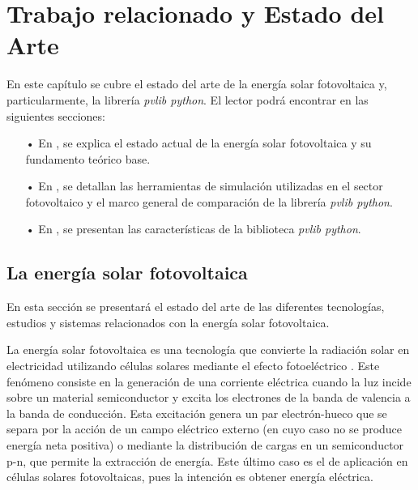 \chapter{Trabajo relacionado y Estado del Arte} \label{chp:state-of-the-art}

En este capítulo se cubre el estado del arte de la energía solar fotovoltaica y, particularmente, la librería \textit{pvlib python}. El lector podrá encontrar en las siguientes secciones:

\begin{itemize}

    \item[•] En , se explica el estado actual de la energía solar fotovoltaica y su fundamento teórico base.

    \item[•] En , se detallan las herramientas de simulación utilizadas en el sector fotovoltaico y el marco general de comparación de la librería \textit{pvlib python}.

    \item[•] En , se presentan las características de la biblioteca \textit{pvlib python}.

\end{itemize}


\section{La energía solar fotovoltaica} \label{sct:energia-solar}

En esta sección se presentará el estado del arte de las diferentes tecnologías, estudios y sistemas relacionados con la energía solar fotovoltaica.

La energía solar fotovoltaica es una tecnología que convierte la radiación solar en electricidad utilizando células solares mediante el efecto fotoeléctrico \cite[][pp. 701-706]{böer2002survey}.
Este fenómeno consiste en la generación de una corriente eléctrica cuando la luz incide sobre un material semiconductor y excita los electrones de la banda de valencia a la banda de conducción. Esta excitación genera un par electrón-hueco que se separa por la acción de un campo eléctrico externo (en cuyo caso no se produce energía neta positiva) o mediante la distribución de cargas en un semiconductor p-n, que permite la extracción de energía. Este último caso es el de aplicación en células solares fotovoltaicas, pues la intención es obtener energía eléctrica.

